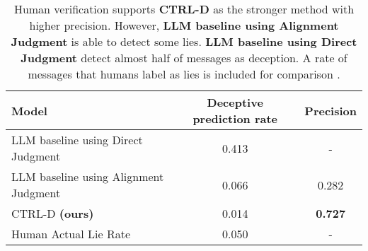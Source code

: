 \begin{table*}[h]
    \centering
    \begin{tabular}{lcc}
        \hline
        \textbf{Model} & \textbf{Deceptive prediction rate} &\textbf{Precision} \\
        \hline
        LLM baseline using Direct Judgment & 0.413 & - \\
        LLM baseline using Alignment Judgment & 0.066 & 0.282  \\
        CTRL-D \textbf{(ours)} & 0.014 & \textbf{0.727} \\
        Human Actual Lie Rate & 0.050 & -\\
        \hline
    \end{tabular}
    \caption{Human verification supports \textbf{CTRL-D} as the stronger method with higher precision. However, \textbf{LLM baseline using Alignment Judgment} is able to detect some lies. \textbf{LLM baseline using Direct Judgment} detect almost half of messages as deception. A rate of messages that humans label as lies is included for comparison \cite{peskov2020takes}.}
    \label{tab:meta_results}
\end{table*}
